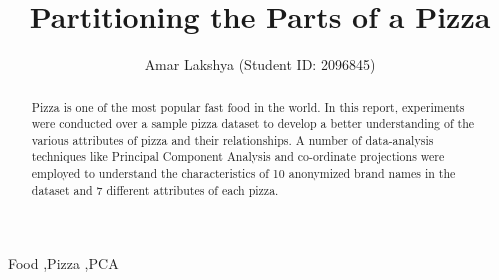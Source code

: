 \documentclass[preprint,12pt]{elsarticle}
\begin{document}
\begin{frontmatter}



\title{Partitioning the Parts of a Pizza}


\author{Amar Lakshya (Student ID: 2096845)}

\address{School of Computer Science, University of Birmingham}

\begin{abstract}
Pizza is one of the most popular fast food in the world. In this report, experiments were conducted over a sample pizza dataset
to develop a better understanding of the various attributes of pizza and their relationships. A number of data-analysis techniques
like Principal Component Analysis and co-ordinate projections were employed to understand the characteristics of  10 anonymized
brand names in the dataset and 7 different attributes of each pizza.
\end{abstract}

\begin{keyword}
Food \sep Pizza \sep PCA

\end{keyword}

\end{frontmatter}


\end{document}

